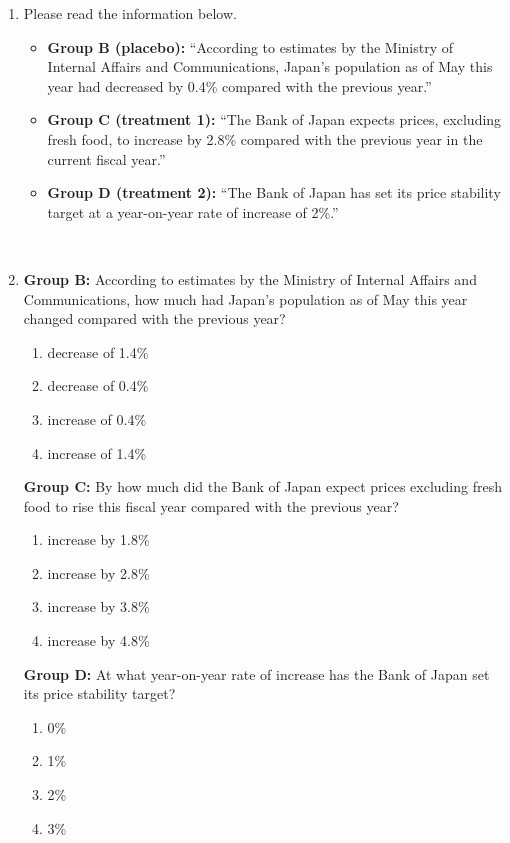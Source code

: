 \documentclass[a4paper,12pt]{article}
\begin{document}
\begin{enumerate}
\item[Q.6.] Please read the information below.
	\begin{itemize}
	\item[] {\bf Group B (placebo):}
	``According to estimates by the Ministry of Internal Affairs and Communications,
	Japan's population as of May this year had decreased by 0.4\% compared with the
	previous year.''
	\item[] {\bf Group C (treatment 1):}
	``The Bank of Japan expects prices, excluding fresh food, to increase by 2.8\%
	compared with the previous year in the current fiscal year.''
	\item[] {\bf Group D (treatment 2):}
	``The Bank of Japan has set its price stability target at a year-on-year rate of
	increase of 2\%.''
	\end{itemize}

\

\item[Q.7.]

	\smallskip
	\noindent
	{\bf Group B:} According to estimates by the Ministry of Internal Affairs and
	Communications, how much had Japan's population as of May this year changed
	compared with the previous year?
	\begin{enumerate}[(1)]
	\item decrease of 1.4\%
	\item decrease of 0.4\%
	\item increase of 0.4\%
	\item increase of 1.4\%
	\end{enumerate}

	\smallskip
	\noindent
	{\bf Group C:} By how much did the Bank of Japan expect prices excluding fresh food
	to rise this fiscal year compared with the previous year?
	\begin{enumerate}[(1)]
	\item increase by 1.8\%
	\item increase by 2.8\%
	\item increase by 3.8\%
	\item increase by 4.8\%
	\end{enumerate}

	\smallskip
	\noindent
	{\bf Group D:} At what year-on-year rate of increase has the Bank of Japan set its
	price stability target?
	\begin{enumerate}[(1)]
	\item 0\%
	\item 1\%
	\item 2\%
	\item 3\%
	\end{enumerate}


\end{enumerate}
\end{document}
